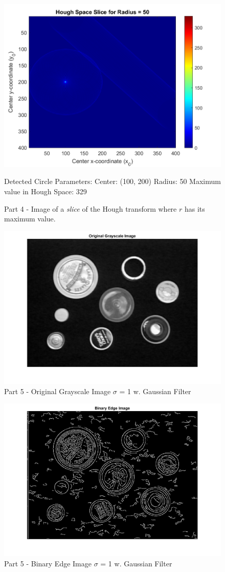 \documentclass[12pt]{article}
\begin{document}
\begin{figure}
	\centering
	\includegraphics[width=0.7\linewidth]{houghSpaceSlice}
	\caption{Part 4 - Image of a \emph{slice} of the Hough transform where $r$ has its maximum value.}
	\label{fig:houghspaceslice}
	\text Detected Circle Parameters:
	Center: (100, 200)
	Radius: 50
	Maximum value in Hough Space: 329
\end{figure}


\begin{figure}
	\centering
	\includegraphics[width=0.7\linewidth]{original_grayscale_image}
	\caption{Part 5 - Original Grayscale Image $\sigma$ = 1 w. Gaussian Filter }
	\label{fig:originalgrayscaleimage}
\end{figure}

\begin{figure}
	\centering
	\includegraphics[width=0.7\linewidth]{binary_edge_image}
	\caption{Part 5 - Binary Edge Image $\sigma$ = 1 w. Gaussian Filter}
	\label{fig:binaryedgeimage}
	
\end{figure}
\end{document}

